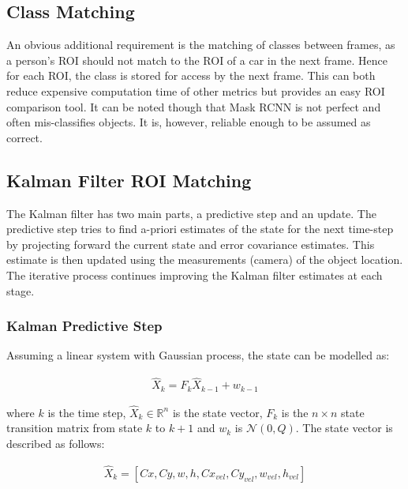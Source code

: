 \documentclass[a4paper,11pt,notitlepage]{article}
\begin{document}
\subsection{Class Matching} \label{class_matching}
An obvious additional requirement is the matching of classes between frames, as a person's ROI should not match to the ROI of a car in the next frame. Hence for each ROI, the class is stored for access by the next frame. This can both reduce expensive computation time of other metrics but provides an easy ROI comparison tool. It can be noted though that Mask RCNN is not perfect and often mis-classifies objects. It is, however, reliable enough to be assumed as correct.

\subsection{Kalman Filter ROI Matching} \label{kalman_matching}

The Kalman filter has two main parts, a predictive step and an update. The predictive step tries to find a-priori estimates of the state for the next time-step by projecting forward the current state and error covariance estimates. This estimate is then updated using the measurements (camera) of the object location. The iterative process continues improving the Kalman filter estimates at each stage.

\subsubsection{Kalman Predictive Step}
Assuming a linear system with Gaussian process, the state can be modelled as:

\begin{equation}
\begin{aligned}
\hat{X}_{k} =  F_{k} \hat{X}_{k-1} + w_{k-1}
\end{aligned}
\end{equation}

where $k$ is the time step, $\hat{X}_{k} \in \mathbb{R}^{n}$ is the state vector, $F_{k}$ is the $n \times n$ state transition matrix from state $k$ to $k+1$ and $w_{k}$ is $\mathcal{N}(0,Q)$. The state vector is described as follows:

\begin{equation}
\begin{aligned}
\hat{X}_{k} =  [Cx,Cy,w,h,Cx_{vel},Cy_{vel},w_{vel},h_{vel}]
\end{aligned}
\end{equation}
\end{document}
